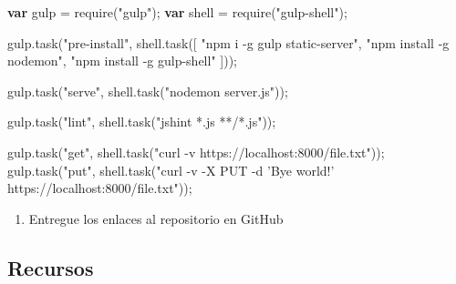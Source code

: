 \documentclass[]{article}
\newenvironment{Shaded}{}{}
\newcommand{\AttributeTok}[1]{\textcolor[rgb]{0.49,0.56,0.16}{#1}}
\newcommand{\KeywordTok}[1]{\textcolor[rgb]{0.00,0.44,0.13}{\textbf{#1}}}
\newcommand{\NormalTok}[1]{#1}
\newcommand{\OperatorTok}[1]{\textcolor[rgb]{0.40,0.40,0.40}{#1}}
\newcommand{\StringTok}[1]{\textcolor[rgb]{0.25,0.44,0.63}{#1}}
\newcommand{\VariableTok}[1]{\textcolor[rgb]{0.10,0.09,0.49}{#1}}
\providecommand{\tightlist}{%
  \setlength{\itemsep}{0pt}\setlength{\parskip}{0pt}}
\begin{document}
\begin{Shaded}
\begin{Highlighting}[]
\KeywordTok{var}\NormalTok{ gulp }\OperatorTok{=} \AttributeTok{require}\NormalTok{(}\StringTok{"gulp"}\NormalTok{)}\OperatorTok{;}
\KeywordTok{var}\NormalTok{ shell }\OperatorTok{=} \AttributeTok{require}\NormalTok{(}\StringTok{"gulp-shell"}\NormalTok{)}\OperatorTok{;}

\VariableTok{gulp}\NormalTok{.}\AttributeTok{task}\NormalTok{(}\StringTok{"pre-install"}\OperatorTok{,} \VariableTok{shell}\NormalTok{.}\AttributeTok{task}\NormalTok{([}
      \StringTok{"npm i -g gulp static-server"}\OperatorTok{,}
      \StringTok{"npm install -g nodemon"}\OperatorTok{,}
      \StringTok{"npm install -g gulp-shell"}
\NormalTok{]))}\OperatorTok{;}

\VariableTok{gulp}\NormalTok{.}\AttributeTok{task}\NormalTok{(}\StringTok{"serve"}\OperatorTok{,} \VariableTok{shell}\NormalTok{.}\AttributeTok{task}\NormalTok{(}\StringTok{"nodemon server.js"}\NormalTok{))}\OperatorTok{;}

\VariableTok{gulp}\NormalTok{.}\AttributeTok{task}\NormalTok{(}\StringTok{"lint"}\OperatorTok{,} \VariableTok{shell}\NormalTok{.}\AttributeTok{task}\NormalTok{(}\StringTok{"jshint *.js **/*.js"}\NormalTok{))}\OperatorTok{;}

\VariableTok{gulp}\NormalTok{.}\AttributeTok{task}\NormalTok{(}\StringTok{"get"}\OperatorTok{,} \VariableTok{shell}\NormalTok{.}\AttributeTok{task}\NormalTok{(}\StringTok{"curl -v https://localhost:8000/file.txt"}\NormalTok{))}\OperatorTok{;}
\VariableTok{gulp}\NormalTok{.}\AttributeTok{task}\NormalTok{(}\StringTok{"put"}\OperatorTok{,} \VariableTok{shell}\NormalTok{.}\AttributeTok{task}\NormalTok{(}\StringTok{"curl -v -X PUT -d 'Bye world!' https://localhost:8000/file.txt"}\NormalTok{))}\OperatorTok{;}

\end{Highlighting}
\end{Shaded}

\begin{enumerate}
\def\labelenumi{\arabic{enumi}.}
\setcounter{enumi}{5}
\tightlist
\item
  Entregue los enlaces al repositorio en GitHub
\end{enumerate}

\hypertarget{recursos}{%
\subsection{Recursos}\label{recursos}}
\end{document}
